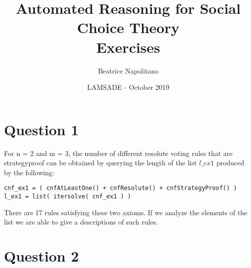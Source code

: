 \documentclass[a4paper,notitlepage]{article}
\begin{document}
\author{Beatrice Napolitano}
\title{Automated Reasoning for Social Choice Theory \\ Exercises }
\date{LAMSADE - October 2019}
\maketitle

\section{Question 1}
For n = 2 and m = 3, the number of different resolute voting rules that are strategyproof can be obtained by querying the length of the list $l\_ex1$ produced by the following:
\begin{lstlisting}
cnf_ex1 = ( cnfAtLeastOne() + cnfResolute() + cnfStrategyProof() )
l_ex1 = list( itersolve( cnf_ex1 ) )
\end{lstlisting}
There are 17 rules satisfying these two axioms. If we analyze the elements of the list we are able to give a descriptions of such rules.

\section{Question 2}
\end{document}
